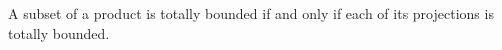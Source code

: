 A subset of a product is totally bounded if and only if each of its projections is totally bounded.
